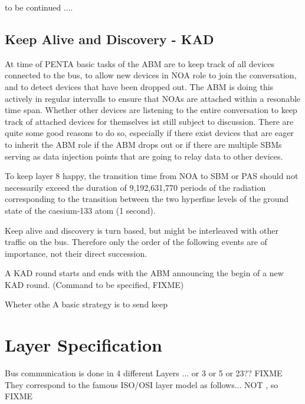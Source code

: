 \documentclass[a4paper,12pt]{scrartcl}
\begin{document}
to be continued ....





\subsection{Keep Alive and Discovery - KAD}
At time of PENTA basic tasks of the ABM are to keep track of all devices connected to the bus,
to allow new devices in NOA role to join the conversation, and to detect devices that have been dropped out.
The ABM is doing this actively in regular intervalls to ensure that NOAs are attached within a resonable time span.
Whether other devices are listening to the entire conversation to keep track of attached devices for themselves ist still subject to discussion.
There are quite some good reasons to do so, especially if there exist devices that are eager to inherit the ABM role if the ABM drops out
or if there are multiple SBMs serving as data injection points that are going to relay data to other devices.

To keep layer 8 happy, the transition time from NOA to SBM or PAS should not necessarily exceed the duration
of 9,192,631,770 periods of the radiation corresponding to the transition between the two hyperfine levels
of the ground state of the caesium-133 atom (1 second).

Keep alive and discovery is turn based, but might be interleaved with other traffic on the bus.
Therefore only the order of the following events are of importance, not their direct succession.

A KAD round starts and ends with the ABM announcing the begin of a new KAD round. (Command to be specified, FIXME)




 Wheter othe
A basic strategy is to send keep


\section{Layer Specification}
Bus communication is done in 4 different Layers ... or 3 or 5 or 23?? FIXME
They correspond to the famous ISO/OSI layer model as follows... NOT , so FIXME

\end{document}
